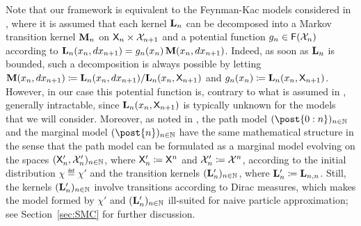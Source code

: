 \begin{remark} \label{we:vs:delmoral}
    Note that our framework is equivalent to the Feynman-Kac models considered in \cite[Section~1.3]{delmoral:2004}, where it is assumed that each kernel $\mathbf{L}_{n}$ can be decomposed into a Markov transition kernel $\mathbf{M}_n$ on $\mathsf{X}_n \times \mathcal{X}_{n + 1}$ and a potential function $g_{n} \in \mathsf{F}(\mathcal{X}_n)$ according to $\mathbf{L}_{n}(x_n, d x_{n + 1}) = g_{n}(x_n) \, \mathbf{M}(x_n, d x_{n + 1})$. Indeed, as soon as $\mathbf{L}_{n}$ is bounded, such a decomposition is always possible by letting $\mathbf{M}(x_n, d x_{n + 1}) \coloneqq \mathbf{L}_{n}(x_n, d x_{n + 1}) / \mathbf{L}_{n}(x_n, \mathsf{X}_{n + 1})$ and $g_{n}(x_n) \coloneqq \mathbf{L}_{n}(x_n, \mathsf{X}_{n + 1})$. However, in our case this potential function is, contrary to what is assumed in \cite{delmoral:2004}, generally intractable, since $\mathbf{L}_{n}(x_n, \mathsf{X}_{n + 1})$ is typically unknown for the models that we will consider. Moreover, as noted in \cite[Section~1.3]{delmoral:2004}, the path model $(\post{0:n})_{n \in \nset}$ and the marginal model $(\post{n})_{n \in \nset}$ have the same mathematical structure in the sense that the path model can be formulated as a marginal model evolving on the spaces $(\mathsf{X}_n', \mathcal{X}_n')_{n \in \mathbb{N}}$, where $\mathsf{X}_n' \coloneqq \mathsf{X}^n$ and $\mathcal{X}_n' \coloneqq \mathcal{X}^n$, according to the initial distribution $\chi \eqdef \chi'$ and the transition kernels $(\mathbf{L}_{n}')_{n \in \mathbb{N}}$, where $\mathbf{L}_{n}' \coloneqq \mathbf{L}_{n, n}$. Still, the kernels $(\mathbf{L}_{n}')_{n \in \mathbb{N}}$ involve transitions according to Dirac measures, which makes the model formed by $\chi'$ and $(\mathbf{L}_{n}')_{n \in \mathbb{N}}$ ill-suited for naive particle approximation; see Section~\ref{sec:SMC} for further discussion. 
\end{remark}

